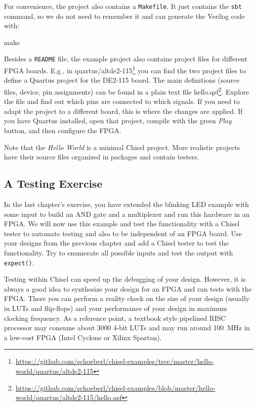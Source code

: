 \documentclass[%
    10pt,
    headinclude, footexclude,
    openright, %
    notitlepage,
    cleardoubleempty,
    headsepline,
    pointlessnumbers,
    bibtotoc, idxtotoc,
    ]{scrbook}
\newcommand{\code}[1]{{\lstinline[basicstyle=\small\ttfamily]{#1}}}
\newcommand{\myref}[2]{\href{#1}{#2}}
\renewcommand{\myref}[2]{{#2}{\footnote{\url{#1}}}}
\begin{document}
For convenience, the project also contains a \code{Makefile}.
It just contains the \code{sbt} command, so we do not need to remember it and
can generate the Verilog code with:

\begin{chisel}
make
\end{chisel}

Besides a \code{README} file, the example project also contains project
files for different FPGA boards. E.g., in
\myref{https://github.com/schoeberl/chisel-examples/tree/master/hello-world/quartus/altde2-115}{quartus/altde2-115}
you can find the two project files to define a Quartus project for the DE2-115 board.
The main definitions (source files, device, pin assignments) can be found in a plain text file
\myref{https://github.com/schoeberl/chisel-examples/blob/master/hello-world/quartus/altde2-115/hello.qsf}{hello.qsf}.
Explore the file and find out which pins are connected to which signals.
If you need to adapt the project to a different board, this is where the changes are applied.
If you have Quartus installed, open that project, compile with the green \emph{Play} button,
and then configure the FPGA.

Note that the \emph{Hello World} is a minimal Chisel project.
More realistic projects have their source files organized in packages and contain testers.

\subsection{A Testing Exercise}

In the last chapter's exercise, you have extended the blinking LED example with some input
to build an AND gate and a multiplexer and run this hardware in an FPGA.
We will now use this example and test the functionality with a Chisel tester
to automate testing and also to be independent of an FPGA board.
Use your designs from the previous chapter and add a Chisel tester to test the functionality.
Try to enumerate all possible inputs and test the output with \code{expect()}.

Testing within Chisel can speed up the debugging of your design.
However, it is always a good idea to synthesize your design for an FPGA and run tests
with the FPGA. There you can perform a reality check on the size of your design (usually
in LUTs and flip-flops) and your performance of your design in maximum clocking frequency.
As a reference point, a textbook style pipelined RISC processor may consume about 3000
4-bit LUTs and may run around 100~MHz in a low-cost FPGA (Intel Cyclone or
Xilinx Spartan).
\end{document}
